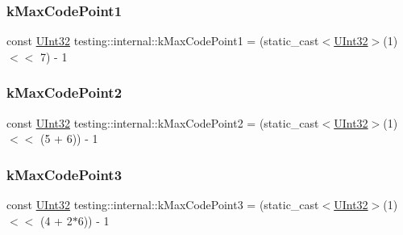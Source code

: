 \subsubsection{\texorpdfstring{kMaxCodePoint1}{kMaxCodePoint1}}
{\footnotesize\ttfamily const \mbox{\hyperlink{namespacetesting_1_1internal_a40d4fffcd2bf56f18b1c380615aa85e3}{U\+Int32}} testing\+::internal\+::k\+Max\+Code\+Point1 = (static\+\_\+cast$<$\mbox{\hyperlink{namespacetesting_1_1internal_a40d4fffcd2bf56f18b1c380615aa85e3}{U\+Int32}}$>$(1) $<$$<$ 7) -\/ 1}

\mbox{\label{namespacetesting_1_1internal_ab8f4a5ed784352f00342cfeadc72337e}} 
\subsubsection{\texorpdfstring{kMaxCodePoint2}{kMaxCodePoint2}}
{\footnotesize\ttfamily const \mbox{\hyperlink{namespacetesting_1_1internal_a40d4fffcd2bf56f18b1c380615aa85e3}{U\+Int32}} testing\+::internal\+::k\+Max\+Code\+Point2 = (static\+\_\+cast$<$\mbox{\hyperlink{namespacetesting_1_1internal_a40d4fffcd2bf56f18b1c380615aa85e3}{U\+Int32}}$>$(1) $<$$<$ (5 + 6)) -\/ 1}

\mbox{\label{namespacetesting_1_1internal_aa42bd507418e570402996e33582beed3}} 
\subsubsection{\texorpdfstring{kMaxCodePoint3}{kMaxCodePoint3}}
{\footnotesize\ttfamily const \mbox{\hyperlink{namespacetesting_1_1internal_a40d4fffcd2bf56f18b1c380615aa85e3}{U\+Int32}} testing\+::internal\+::k\+Max\+Code\+Point3 = (static\+\_\+cast$<$\mbox{\hyperlink{namespacetesting_1_1internal_a40d4fffcd2bf56f18b1c380615aa85e3}{U\+Int32}}$>$(1) $<$$<$ (4 + 2$\ast$6)) -\/ 1}

\mbox{\label{namespacetesting_1_1internal_acd87c60be9b5fedb2d017503d8834474}} 
